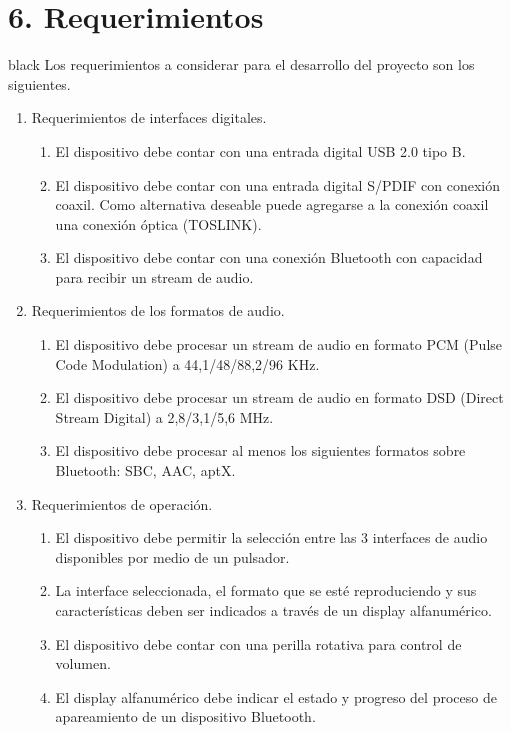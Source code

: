 \documentclass[
11pt, %
codirector, %
]{charter}
\begin{document}
\section{6. Requerimientos}
\label{sec:requerimientos}

\begin{consigna}{black}
Los requerimientos a considerar para el desarrollo del proyecto son los siguientes.

\begin{enumerate}
	\item Requerimientos de interfaces digitales.
		\begin{enumerate}
			\item El dispositivo debe contar con una entrada digital USB 2.0 tipo B. 
			\item El dispositivo debe contar con una entrada digital S/PDIF con conexión coaxil. Como alternativa deseable puede agregarse a la conexión coaxil una conexión óptica (TOSLINK).
			\item El dispositivo debe contar con una conexión Bluetooth con capacidad para recibir un stream de audio.   
		\end{enumerate}
	\item Requerimientos de los formatos de audio.
		\begin{enumerate}
			\item El dispositivo debe procesar un stream de audio en formato PCM (Pulse Code Modulation) a 44,1/48/88,2/96 KHz.
			\item El dispositivo debe procesar un stream de audio en formato DSD (Direct Stream Digital) a 2,8/3,1/5,6 MHz.
			\item El dispositivo debe procesar al menos los siguientes formatos sobre Bluetooth: SBC, AAC, aptX.  
		\end{enumerate}
	\item Requerimientos de operación.
		\begin{enumerate}		
			\item El dispositivo debe permitir la selección entre las 3 interfaces de audio disponibles por medio de un pulsador. 	
			\item La interface seleccionada, el formato que se esté reproduciendo y sus características deben ser indicados a través de un display alfanumérico.
			\item El dispositivo debe contar con una perilla rotativa para control de volumen. 
			\item El display alfanumérico debe indicar el estado y progreso del proceso de apareamiento de un dispositivo Bluetooth.

\end{enumerate}
\end{enumerate}
\end{consigna}
\end{document}
